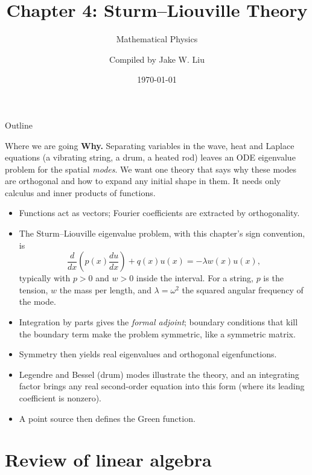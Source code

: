 \documentclass[11pt]{beamer}
\author[]{Compiled by Jake W. Liu}
\title[Sturm--Liouville Theory]{Chapter 4: Sturm--Liouville Theory}
\subtitle{Mathematical Physics}
\date{\today}
\begin{document}
\setcounter{sfchapter}{4}
\renewcommand{\thesection}{\arabic{sfchapter}.\arabic{section}}

\begin{frame}[c]\titlepage
\end{frame}

\begin{frame}{Outline}
\tableofcontents
\end{frame}

\begin{frame}{Where we are going}
\footnotesize
\textbf{Why.} Separating variables in the wave, heat and Laplace equations (a
vibrating string, a drum, a heated rod) leaves an ODE eigenvalue problem for the
spatial \emph{modes}. We want one theory that says why these modes are orthogonal
and how to expand any initial shape in them. It needs only calculus and inner
products of functions.
\begin{itemize}
  \item Functions act as vectors; Fourier coefficients are extracted by orthogonality.
  \item The Sturm--Liouville eigenvalue problem, with this chapter's sign convention, is
        \[
          \frac{d}{dx}\left(p(x)\frac{du}{dx}\right)+q(x)u(x)
          =-\lambda w(x)u(x),
        \]
        typically with $p>0$ and $w>0$ inside the interval. For a string, $p$ is the
        tension, $w$ the mass per length, and $\lambda=\omega^2$ the squared angular
        frequency of the mode.
  \item Integration by parts gives the \emph{formal adjoint}; boundary conditions that
        kill the boundary term make the problem symmetric, like a symmetric matrix.
  \item Symmetry then yields real eigenvalues and orthogonal eigenfunctions.
  \item Legendre and Bessel (drum) modes illustrate the theory, and an integrating
        factor brings any real second-order equation into this form (where its
        leading coefficient is nonzero).
  \item A point source then defines the Green function.
\end{itemize}
\end{frame}

\section{Review of linear algebra}
\end{document}

